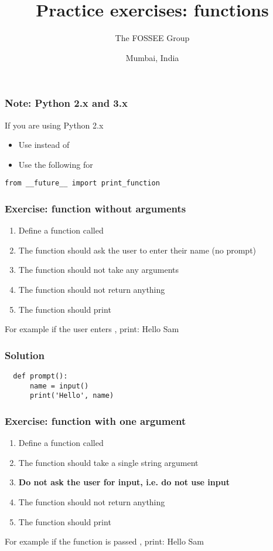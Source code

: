 \documentclass[14pt,compress]{beamer}
\title[Basic Python]{Practice exercises: functions}
\author[FOSSEE Team] {The FOSSEE Group}
\institute[FOSSEE -- IITB] {Department of Aerospace Engineering\\IIT Bombay}
\date[] {Mumbai, India}
\begin{document}
\begin{frame}
  \titlepage
\end{frame}

\begin{frame}
  \frametitle{Note: Python 2.x and 3.x}

 If you are using Python 2.x
  \begin{itemize}
  \item Use  instead of 
  \item Use the following for 
  \end{itemize}
 \begin{lstlisting}
from __future__ import print_function
\end{lstlisting}
\end{frame}

\begin{frame}[plain]
  \frametitle{Exercise: function without arguments}
  \begin{enumerate}
  \item Define a function called 
  \item The function should ask the user to enter their name (no prompt)
  \item The function should not take any arguments
  \item The function should not return anything
  \item The function should print 
  \end{enumerate}
  For example if the user enters , print:
  Hello Sam
\end{frame}

\begin{frame}
\frametitle{Solution}
\begin{lstlisting}
  def prompt():
      name = input()
      print('Hello', name)
\end{lstlisting}
\end{frame}

\begin{frame}[plain]
  \frametitle{Exercise: function with one argument}
  \begin{enumerate}
  \item Define a function called 
  \item The function should take a single string argument
  \item \textbf{Do not ask the user for input, i.e. do not use input}
  \item The function should not return anything
  \item The function should print 
  \end{enumerate}
  For example if the function is passed , print:
  Hello Sam
\end{frame}
\end{document}
